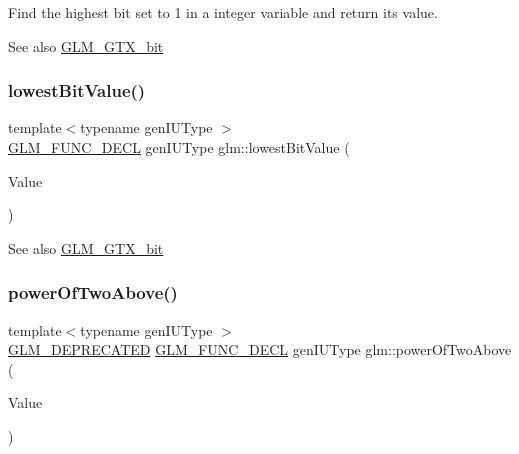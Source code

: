 Find the highest bit set to 1 in a integer variable and return its value.

\begin{DoxySeeAlso}{See also}
\mbox{\hyperlink{group__gtx__bit}{G\+L\+M\+\_\+\+G\+T\+X\+\_\+bit}} 
\end{DoxySeeAlso}
\mbox{\label{group__gtx__bit_ga2ff6568089f3a9b67f5c30918855fc6f}} 
\subsubsection{\texorpdfstring{lowest\+Bit\+Value()}{lowestBitValue()}}
{\footnotesize\ttfamily template$<$typename gen\+I\+U\+Type $>$ \\
\mbox{\hyperlink{setup_8hpp_ab2d052de21a70539923e9bcbf6e83a51}{G\+L\+M\+\_\+\+F\+U\+N\+C\+\_\+\+D\+E\+CL}} gen\+I\+U\+Type glm\+::lowest\+Bit\+Value (\begin{DoxyParamCaption}\item[{gen\+I\+U\+Type}]{Value }\end{DoxyParamCaption})}

\begin{DoxySeeAlso}{See also}
\mbox{\hyperlink{group__gtx__bit}{G\+L\+M\+\_\+\+G\+T\+X\+\_\+bit}} 
\end{DoxySeeAlso}
\mbox{\label{group__gtx__bit_ga8cda2459871f574a0aecbe702ac93291}} 
\subsubsection{\texorpdfstring{power\+Of\+Two\+Above()}{powerOfTwoAbove()}\hspace{0.1cm}{\footnotesize\ttfamily [1/2]}}
{\footnotesize\ttfamily template$<$typename gen\+I\+U\+Type $>$ \\
\mbox{\hyperlink{setup_8hpp_a8edfb48cdc249a3ee48406bf179023dc}{G\+L\+M\+\_\+\+D\+E\+P\+R\+E\+C\+A\+T\+ED}} \mbox{\hyperlink{setup_8hpp_ab2d052de21a70539923e9bcbf6e83a51}{G\+L\+M\+\_\+\+F\+U\+N\+C\+\_\+\+D\+E\+CL}} gen\+I\+U\+Type glm\+::power\+Of\+Two\+Above (\begin{DoxyParamCaption}\item[{gen\+I\+U\+Type}]{Value }\end{DoxyParamCaption})}

